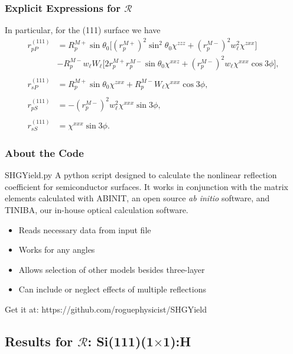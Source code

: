 \documentclass{beamer}
\begin{document}
\begin{frame}
\frametitle{Explicit Expressions for $\mathcal{R}$}
In particular, for the (111) surface we have
\begin{align*}
r^{(111)}_{pP} &= 
R^{M+}_{p}\sin\theta_{0}
\Big[
  \left(r^{M+}_{p}\right)^{2}\sin^{2}\theta_{0}\chi^{zzz}
+ \left(r^{M-}_{p}\right)^{2}w^{2}_{\ell}\chi^{zxx}
\Big]\\
&- R^{M-}_{p}w_{\ell}W_{\ell}
\Big[
  2r^{M+}_{p}r^{M-}_{p}\sin\theta_{0}\chi^{xxz}
+ \left(r^{M-}_{p}\right)^{2}w_{\ell}\chi^{xxx}\cos3\phi
\Big],\\\\
r^{(111)}_{sP} &= 
R^{M+}_{p}\sin\theta_{0}\chi^{zxx} +
R^{M-}_{p}W_{\ell}\chi^{xxx}\cos3\phi,\\\\
r^{(111)}_{pS} &= - \left(r^{M-}_{p}\right)^{2}w^{2}_{\ell}\chi^{xxx}\sin3\phi,\\\\
r^{(111)}_{sS} &= \chi^{xxx}\sin3\phi.
\end{align*}
\end{frame}

\begin{frame}
\frametitle{About the Code}
\begin{block}{SHGYield.py}
A python script designed to calculate the nonlinear reflection coefficient for
semiconductor surfaces. It works in conjunction with the matrix elements
calculated with ABINIT, an open source \emph{ab initio} software, and TINIBA,
our in-house optical calculation software.
\begin{itemize}
\item Reads necessary data from input file
\item Works for any angles
\item Allows selection of other models besides three-layer
\item Can include or neglect effects of multiple reflections
\end{itemize}
\end{block}
Get it at: https://github.com/roguephysicist/SHGYield
\end{frame}



\subsection{Results for \texorpdfstring{$\mathcal{R}$}{R}: 
Si(111)(1\texorpdfstring{$\times$}{x}1):H}
\end{document}
